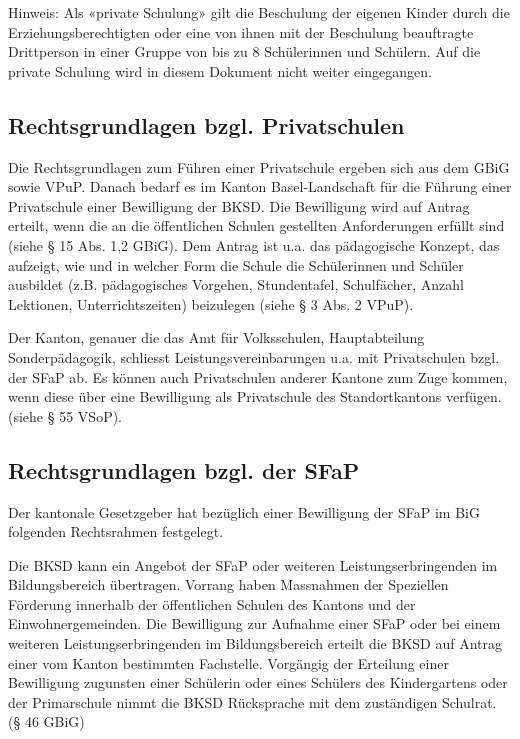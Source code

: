 \documentclass[paper=a4, onesite]{scrreprt}
\newcounter{rz}
\newcommand{\Rz}{\addtocounter{rz}{1}\marginpar{\texttt{(\textit{\arabic{rz}})}}}
\begin{document}
Hinweis: Als «private Schulung» gilt die Beschulung der eigenen Kinder durch die Erziehungsberechtigten oder eine von ihnen mit der Beschulung beauftragte Drittperson in einer Gruppe von bis zu 8 Schülerinnen und Schülern. Auf die private Schulung wird in diesem Dokument nicht weiter eingegangen.



\subsection{Rechtsgrundlagen bzgl. Privatschulen} \label{rgPrivatSchule}
\Rz Die Rechtsgrundlagen zum Führen einer Privatschule ergeben sich aus dem \ac{GBiG} sowie \ac{VPuP}. Danach bedarf es im Kanton Basel-Landschaft für die Führung einer Privatschule einer Bewilligung der \ac{BKSD}. Die Bewilligung wird auf Antrag erteilt, wenn die an die öffentlichen Schulen gestellten Anforderungen erfüllt sind (siehe § 15 Abs. 1,2 \ac{GBiG}).  Dem Antrag ist u.a. das pädagogische Konzept, das aufzeigt, wie und in welcher Form die Schule die Schülerinnen und Schüler ausbildet (z.B. pädagogisches Vorgehen, Stundentafel, Schulfächer, Anzahl Lektionen, Unterrichtszeiten) beizulegen (siehe § 3 Abs. 2 \ac{VPuP}).\\ 

\Rz Der Kanton, genauer die das Amt für Volksschulen, Hauptabteilung Sonderpädagogik, schliesst Leistungsvereinbarungen u.a. mit Privatschulen bzgl. der \ac{SFaP} ab. Es können auch Privatschulen anderer Kantone zum Zuge kommen, wenn diese über eine Bewilligung als Privatschule des Standortkantons verfügen. (siehe § 55 \ac{VSoP}).


\subsection{Rechtsgrundlagen bzgl. der \ac{SFaP}} \label{rgSFaP}
\Rz Der kantonale Gesetzgeber  hat bezüglich einer Bewilligung der \ac{SFaP} im \ac{BiG} folgenden Rechtsrahmen festgelegt.\\  

\Rz Die \ac{BKSD} kann ein Angebot der \ac{SFaP} oder weiteren Leistungserbringenden im Bildungsbereich übertragen. Vorrang haben Massnahmen der Speziellen Förderung innerhalb der öffentlichen Schulen des Kantons und der Einwohnergemeinden. Die Bewilligung zur Aufnahme einer \ac{SFaP} oder bei einem weiteren Leistungserbringenden im Bildungsbereich erteilt die \ac{BKSD} auf Antrag einer vom Kanton bestimmten Fachstelle. Vorgängig der Erteilung einer Bewilligung zugunsten einer Schülerin oder eines Schülers des Kindergartens oder der Primarschule nimmt die \ac{BKSD} Rücksprache mit dem zuständigen Schulrat. (§ 46 \ac{GBiG})\\
\end{document}
